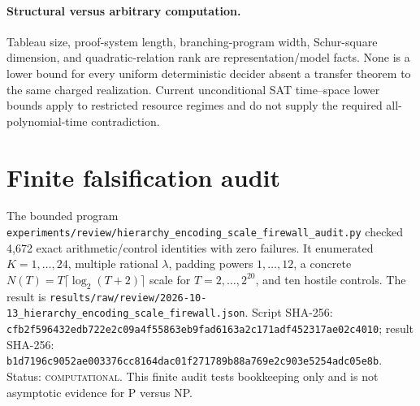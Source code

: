 \documentclass[11pt]{article}
\newcommand{\COMP}{\textsc{computational}}
\begin{document}
\paragraph{Structural versus arbitrary computation.}
Tableau size, proof-system length, branching-program width, Schur-square dimension,
and quadratic-relation rank are representation/model facts.  None is a lower bound
for every uniform deterministic decider absent a transfer theorem to the same
charged realization.  Current unconditional SAT time--space lower bounds apply to
restricted resource regimes and do not supply the required all-polynomial-time
contradiction.

\section{Finite falsification audit}
The bounded program
\texttt{experiments/review/hierarchy\_encoding\_scale\_firewall\_audit.py}
checked 4,672 exact arithmetic/control identities with zero failures.  It enumerated
$K=1,\ldots,24$, multiple rational $\lambda$, padding powers $1,\ldots,12$, a
concrete $N(T)=T\lceil\log_2(T+2)\rceil$ scale for $T=2,\ldots,2^{20}$, and ten
hostile controls.  The result is
\texttt{results/raw/review/2026-10-13\_hierarchy\_encoding\_scale\_firewall.json}.
Script SHA-256:
\texttt{cfb2f596432edb722e2c09a4f55863eb9fad6163a2c171adf452317ae02c4010};
result SHA-256:
\texttt{b1d7196c9052ae003376cc8164dac01f271789b88a769e2c903e5254adc05e8b}.
Status: \COMP{}.  This finite audit tests bookkeeping only and is not asymptotic
evidence for P versus NP.
\end{document}
